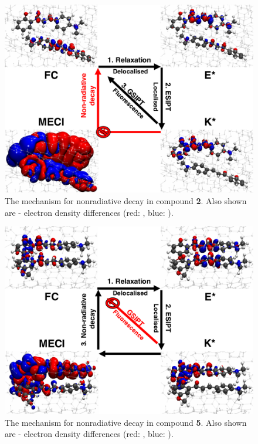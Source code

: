 \begin{figure}
  \centering
  \includegraphics[width=0.8\linewidth]{4IntraInterInteractions/HC_1_Density_Mechanism.pdf}
  \caption[Radiative decay in \textbf{HC1}]{The mechanism for nonradiative decay in compound \textbf{2}. Also shown are \sone-\szero{} electron density differences (red: \sone{}, blue: \szero{}).}
  \label{figure: HC_1_Density_Mechanism}
\end{figure}

\begin{figure}
  \centering
  \includegraphics[width=0.8\linewidth]{4IntraInterInteractions/HC_5_Density_Mechanism.pdf}
  \caption[Nonradiative decay in \textbf{HC5}]{The mechanism for nonradiative decay in compound \textbf{5}. Also shown are \sone-\szero{} electron density differences (red: \sone{}, blue: \szero{}).}
  \label{figure: HC_5_Density_Mechanism}
\end{figure}

